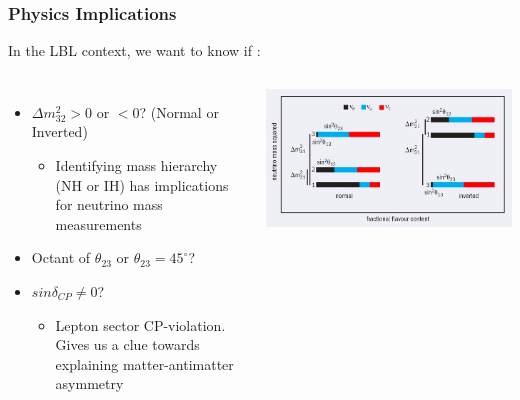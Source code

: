 \documentclass[9pt, aspectratio=169]{beamer}
\begin{document}
\begin{frame}
  \frametitle{Physics Implications}
  In the LBL context, we want to know if :
  \bigskip
      \begin{columns}
        \begin{itemize}
          \item $\Delta m^2_{32} > 0$ or $< 0$? (Normal or Inverted)
            \begin{itemize}
              \item Identifying mass hierarchy (NH or IH) has implications for neutrino mass measurements
            \end{itemize}
            \bigskip
          \item Octant of $\theta_{23}$ or $\theta_{23} = 45^{\circ}$?
            \bigskip
          \item $sin\delta_{CP} \neq 0$?
            \begin{itemize}
              \item Lepton sector CP-violation. Gives us a clue towards explaining matter-antimatter asymmetry
            \end{itemize}
        \end{itemize}
        \includegraphics[scale=0.3]{graphics/hierarchy.png}
      \end{columns}
\end{frame}
\end{document}
